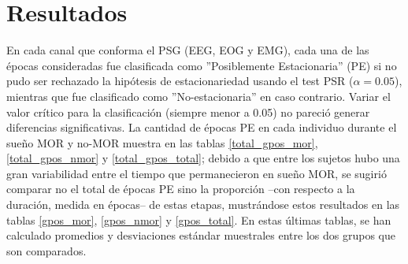 \chapter{Resultados}

En cada canal que conforma el PSG (EEG, EOG y EMG), 
cada una de las \'epocas consideradas fue clasificada como 
''Posiblemente Estacionaria'' (PE) si no pudo ser rechazado la hip\'otesis de 
estacionariedad usando el test PSR ($\alpha = 0.05$), mientras que 
fue clasificado como ''No-estacionaria'' en caso contrario. Variar el valor cr\'itico
para la clasificaci\'on (siempre menor a 0.05) no pareci\'o generar diferencias significativas.
La cantidad de \'epocas PE en cada individuo 
durante el sue\~no MOR y no-MOR
muestra en las tablas \ref{total_gpos_mor}, \ref{total_gpos_nmor} y
\ref{total_gpos_total}; debido a que entre los sujetos hubo una gran variabilidad entre el tiempo 
que permanecieron en sue\~no MOR, se sugiri\'o comparar no el total de \'epocas PE sino
la proporci\'on --con respecto a la duraci\'on, medida en \'epocas-- de estas etapas, 
mustr\'andose estos resultados en las tablas \ref{gpos_mor}, \ref{gpos_nmor} y
\ref{gpos_total}. En estas \'ultimas tablas, se han calculado promedios y desviaciones
est\'andar muestrales entre los dos grupos que son comparados.


